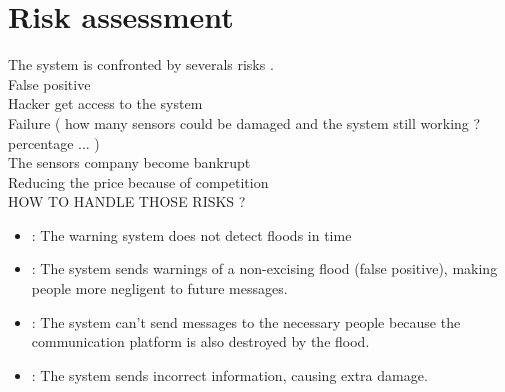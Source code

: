 \section{Risk assessment}


The system is confronted by severals risks .\\
False positive \\
Hacker get access to the system \\
Failure ( how many sensors could be damaged and the system still working ? percentage ... ) \\ 
The sensors company become bankrupt \\
Reducing the price because of competition \\

HOW TO HANDLE THOSE RISKS ?

\begin{itemize}
	\item {}: The warning system does not detect floods in time
	\item {}: The system sends warnings of a non-excising flood (false positive), making people more negligent to future messages.
	\item {}: The system can't send messages to the necessary people because the communication platform is also destroyed by the flood.
	\item {}: The system sends incorrect information, causing extra damage.
\end{itemize}

